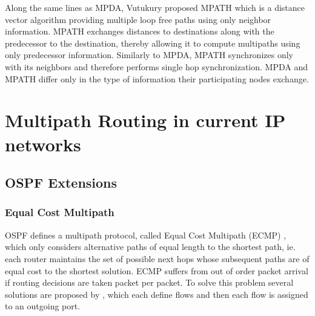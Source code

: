 
Along the same lines as MPDA, Vutukury proposed MPATH \cite{MPATH1, MPATH2} which is a distance vector algorithm providing multiple loop free paths using only neighbor information. MPATH exchanges distances to destinations along with the predecessor to the destination, thereby allowing it to compute multipaths using only predecessor information. Similarly to MPDA, MPATH synchronizes only with its neighbors and therefore performs single hop synchronization. MPDA and MPATH differ only in the type of information their participating nodes exchange.


\section{Multipath Routing in current IP networks}


\subsection{OSPF Extensions}

\subsubsection{Equal Cost Multipath}
\label{sect:eqcostmulti}

OSPF defines a multipath protocol, called Equal Cost Multipath (ECMP) \cite{OSPF}, which only considers alternative paths of equal length to the shortest path, ie. each router maintains the set of possible next hops whose subsequent paths are of equal cost to the shortest solution. ECMP suffers from out of order packet arrival if routing decisions are taken packet per packet. To solve this problem several solutions are proposed by \cite{RFC2991}, which each define flows and then each flow is assigned to an outgoing port.

